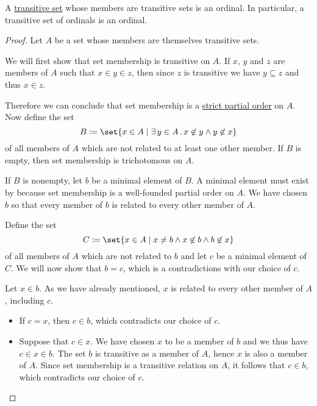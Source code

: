 \begin{proposition}\label{thm:transitive_set_of_transitive_sets_is_ordinal}
  A \hyperref[def:transitive_set]{transitive set} whose members are transitive sets is an ordinal. In particular, a transitive set of ordinals is an ordinal.
\end{proposition}
\begin{proof}
  Let \( A \) be a set whose members are themselves transitive sets.

  We will first show that set membership is transitive on \( A \). If \( x \), \( y \) and \( z \) are members of \( A \) such that \( x \in y \in z \), then since \( z \) is transitive we have \( y \subseteq z \) and thus \( x \in z \).

  Therefore we can conclude that set membership is a \hyperref[def:poset/strict]{strict partial order} on \( A \). Now define the set
  \begin{equation*}
    B \coloneqq \set{ x \in A \given \qexists {y \in A} x \not\in y \wedge y \not\in x }
  \end{equation*}
  of all members of \( A \) which are not related to at least one other member. If \( B \) is empty, then set membership is trichotomous on \( A \).

  If \( B \) is nonempty, let \( b \) be a minimal element of \( B \). A minimal element must exist by  because set membership is a well-founded partial order on \( A \). We have chosen \( b \) so that every member of \( b \) is related to every other member of \( A \).

  Define the set
  \begin{equation*}
    C \coloneqq \set{ x \in A \given x \neq b \wedge x \not\in b \wedge b \not\in x }
  \end{equation*}
  of all members of \( A \) which are not related to \( b \) and let \( c \) be a minimal element of \( C \). We will now show that \( b = c \), which is a contradictions with our choice of \( c \).

  Let \( x \in b \). As we have already mentioned, \( x \) is related to every other member of \( A \), including \( c \).
  \begin{itemize}
    \item If \( c = x \), then \( c \in b \), which contradicts our choice of \( c \).

    \item Suppose that \( c \in x \). We have chosen \( x \) to be a member of \( b \) and we thus have \( c \in x \in b \). The set \( b \) is transitive as a member of \( A \), hence \( x \) is also a member of \( A \). Since set membership is a transitive relation on \( A \), it follows that \( c \in b \), which contradicts our choice of \( c \).


\end{itemize}
\end{proof}
